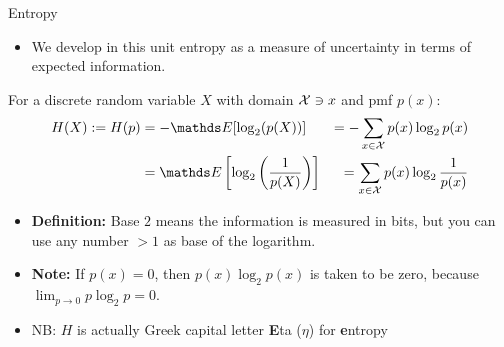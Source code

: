 \documentclass[11pt,compress,t,notes=noshow, xcolor=table]{beamer}
\begin{document}
\begin{vbframe}{Entropy}
\begin{itemize}
  \item We develop in this unit entropy as a measure of uncertainty in terms of expected information.
\end{itemize}


For a discrete random variable $X$ with domain $\mathcal{X} \ni x$ and pmf $p(x)$:
\begin{equation*}
\begin{aligned} 
  H(X) := H(p) &= - \E[\log_2(p(X))]           &= -\sum_{x \in \Xspace} p(x) \log_2 p(x)\\ 
               &=   \E\left[\log_2\left(\frac{1}{p(X)}\right)\right] &= \sum_{x \in \Xspace} p(x) \log_2 \frac{1}{p(x)} 
\end{aligned} 
\end{equation*}
    \begin{itemize}
  \item \textbf{Definition:}
Base $2$ means the information is measured in bits, but you can use any number $>1$ as base of the logarithm.
    \item \textbf{Note:} If $p(x) = 0$, then $p(x) \log_2 p(x)$ is taken to be zero, because $\lim _{p \rightarrow 0} p \log_2 p=0$. %
    \item NB: $H$ is actually Greek capital letter \textbf{E}ta ($\eta$) for \textbf{e}ntropy
  \end{itemize}
  
\end{vbframe}
\end{document}
